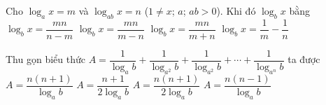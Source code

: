 \begin{ex}%
	Cho $\log_ax=m$ và $\log_{ab}x=n$ ($1\neq x$; $a$; $ab>0$). Khi đó $\log_bx$ bằng
	\choice
	{$\log_bx=\dfrac{mn}{n-m}$}
	{\True $\log_bx=\dfrac{mn}{m-n}$}
	{$\log_bx=\dfrac{mn}{m+n}$}
	{$\log_bx=\dfrac{1}{m}-\dfrac{1}{n}$}
\end{ex}

\begin{ex}%
	Thu gọn biểu thức $A=\dfrac{1}{\log_ab}+\dfrac{1}{\log_{a^2}b}+\dfrac{1}{\log_{a^2}b}+\cdots +\dfrac{1}{\log_{a^n}b}$ ta được
	\choice
	{$A=\dfrac{n(n+1)}{\log_ab}$}
	{$A=\dfrac{n+1}{2\log_ab}$}
	{\True $A=\dfrac{n(n+1)}{2\log_ab}$}
	{$A=\dfrac{n(n-1)}{\log_ab}$}
\end{ex}

